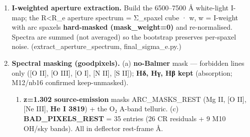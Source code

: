 \documentclass[
]{article}
\providecommand{\tightlist}{%
  \setlength{\itemsep}{0pt}\setlength{\parskip}{0pt}}
\newcommand{\BreakablePath}[1]{{\ttfamily\sloppy #1}}
\begin{document}
\begin{enumerate}
  seeing-grown mask removes nearly the entire aperture and is
  \textbf{infeasible}. (Convolving the binary mask with the PSF and
  cutting at \textgreater25\% / \textgreater10\% arc-light contamination
  gives 42\% / 75\% by count; the \textgreater50\% cut, 1\%, is a
  thin-arc dilution artifact.) This is precisely why we instead (i)
  \textbf{I-weight} the aperture --- the bright deflector core
  dominates, the arc-contaminated outskirts are down-weighted --- and
  (ii) carry the \textbf{mask-weight systematic (±6.65 km/s, w=0→1;
  §2.4.3)} to bracket the residual arc dilution rather than attempt a
  hard PSF-grown mask.
\item
  \textbf{I-weighted aperture extraction.} Build the 6500--7500 Å
  white-light I-map; the R\textless R\_e aperture spectrum = Σ\_spaxel
  cube · w, w = I-weight with arc spaxels \textbf{hard-masked
  (mask\_weight=0)} and re-normalised. Spectra are summed (not averaged)
  so the bootstrap preserves per-spaxel noise.
  (\BreakablePath{extract\_\discretionary{}{}{}aperture\_\discretionary{}{}{}spectrum},
  \BreakablePath{final\_\discretionary{}{}{}sigma\_\discretionary{}{}{}e.\discretionary{}{}{}py}.)
\item
  \textbf{Spectral masking (goodpixels).} (a) \textbf{no-Balmer} mask
  --- forbidden lines only ({[}O II{]}, {[}O III{]}, {[}O I{]}, {[}N
  II{]}, {[}S II{]}); \textbf{Hδ, Hγ, Hβ kept} (absorption; M12/nb16
  confirmed keep-unmasked).

  \begin{enumerate}
  \def\labelenumii{(\alph{enumii})}
  \setcounter{enumii}{1}
  \tightlist
  \item
    \textbf{z=1.302 source-emission} masks
    \BreakablePath{ARC\_\discretionary{}{}{}MASKS\_\discretionary{}{}{}REST}
    (Mg II, {[}O II{]}, {[}Ne III{]}, \textbf{He I 3819}) + the O₂
    A-band telluric. (c)
    \textbf{\BreakablePath{BAD\_\discretionary{}{}{}PIXELS\_\discretionary{}{}{}REST}}
    = 35 entries (26 CR residuals + 9 M10 OH/sky bands). All in
    deflector rest-frame Å.
  \end{enumerate}


\end{enumerate}
\end{document}
